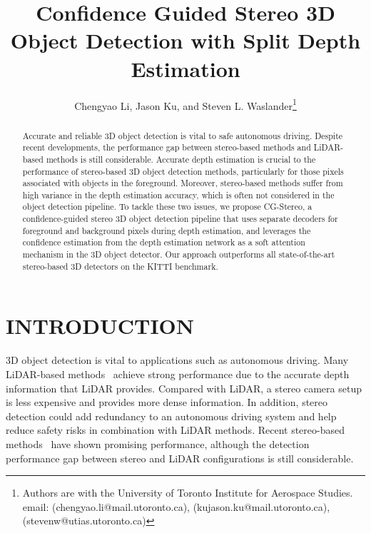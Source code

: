 \documentclass[letterpaper, 10 pt, conference]{ieeeconf}
\title{\LARGE \bf
Confidence Guided Stereo 3D Object Detection with Split Depth Estimation}
\author{Chengyao Li, Jason Ku, and Steven L. Waslander\thanks{Authors are with the University of Toronto Institute for Aerospace Studies.
        {email: (chengyao.li@mail.utoronto.ca)}, {(kujason.ku@mail.utoronto.ca)}, {(stevenw@utias.utoronto.ca)}}}
\begin{document}
\maketitle
\thispagestyle{empty}
\pagestyle{empty}


\begin{abstract}
Accurate and reliable 3D object detection is vital to safe autonomous driving. Despite recent developments, the performance gap between stereo-based methods and LiDAR-based methods is still considerable. Accurate depth estimation is crucial to the performance of stereo-based 3D object detection methods, particularly for those pixels associated with objects in the foreground. Moreover, stereo-based methods suffer from high variance in the depth estimation accuracy, which is often not considered in the object detection pipeline. To tackle these two issues, we propose CG-Stereo, a confidence-guided stereo 3D object detection pipeline that uses separate decoders for foreground and background pixels during depth estimation, and leverages the confidence estimation from the depth estimation network as a soft attention mechanism in the 3D object detector. Our approach outperforms all state-of-the-art stereo-based 3D detectors on the KITTI benchmark.
\end{abstract}


\section{INTRODUCTION}
3D object detection is vital to applications such as autonomous driving. Many LiDAR-based methods~\cite{ku2018joint, chen2017multi, shi2019pointrcnn} achieve strong performance due to the accurate depth information that LiDAR provides. Compared with LiDAR, a stereo camera setup is less expensive and provides more dense information. In addition, stereo detection could add redundancy to an autonomous driving system and help reduce safety risks in combination with LiDAR methods. Recent stereo-based methods~\cite{wang2019pseudo, you2019pseudo, pon2019object, li2019stereo} have shown promising performance, although the detection performance gap between stereo and LiDAR configurations is still considerable. 
\end{document}
